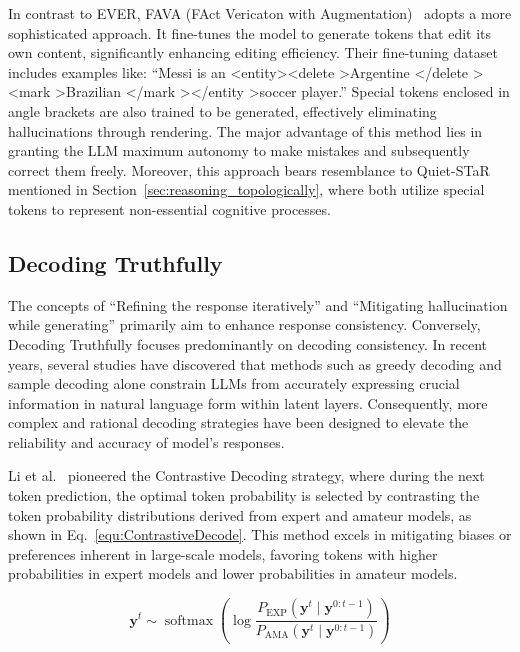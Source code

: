 \documentclass[lettersize,journal]{IEEEtran}
\begin{document}
In contrast to EVER, FAVA (FAct Vericaton with Augmentation)~\cite{FAVA_24_arXiv_Washington} adopts a more sophisticated approach. It fine-tunes the model to generate tokens that edit its own content, significantly enhancing editing efficiency. Their fine-tuning dataset includes examples like: ``Messi is an \textless entity\textgreater \textless delete \textgreater Argentine \textless /delete \textgreater \textless mark \textgreater Brazilian \textless /mark \textgreater \textless /entity \textgreater soccer player.'' Special tokens enclosed in angle brackets are also trained to be generated, effectively eliminating hallucinations through rendering. The major advantage of this method lies in granting the LLM maximum autonomy to make mistakes and subsequently correct them freely. Moreover, this approach bears resemblance to Quiet-STaR~\cite{QuietSTaR_24_arXiv_Stanford} mentioned in Section~\ref{sec:reasoning_topologically}, where both utilize special tokens to represent non-essential cognitive processes.


\subsection{Decoding Truthfully} \label{sec:decoding_truthfully}


\noindent The concepts of ``Refining the response iteratively'' and ``Mitigating hallucination while generating'' primarily aim to enhance response consistency. Conversely, Decoding Truthfully focuses predominantly on decoding consistency. In recent years, several studies have discovered that methods such as greedy decoding and sample decoding alone constrain LLMs from accurately expressing crucial information in natural language form within latent layers. Consequently, more complex and rational decoding strategies have been designed to elevate the reliability and accuracy of model's responses.

Li et al.~\cite{CD_22_arXiv_Stanford} pioneered the Contrastive Decoding strategy, where during the next token prediction, the optimal token probability is selected by contrasting the token probability distributions derived from expert and amateur models, as shown in Eq.~\ref{equ:ContrastiveDecode}. This method excels in mitigating biases or preferences inherent in large-scale models, favoring tokens with higher probabilities in expert models and lower probabilities in amateur models.

\begin{equation}
\label{equ:ContrastiveDecode}
\boldsymbol{y}^t \sim \operatorname{softmax}\left(\log \frac{P_{\mathrm{EXP}}\left(\boldsymbol{y}^t \mid \boldsymbol{y}^{0:t-1}\right)}{P_{\mathrm{AMA}}\left(\boldsymbol{y}^t \mid \boldsymbol{y}^{0:t-1}\right)}\right)
\end{equation}
\end{document}
